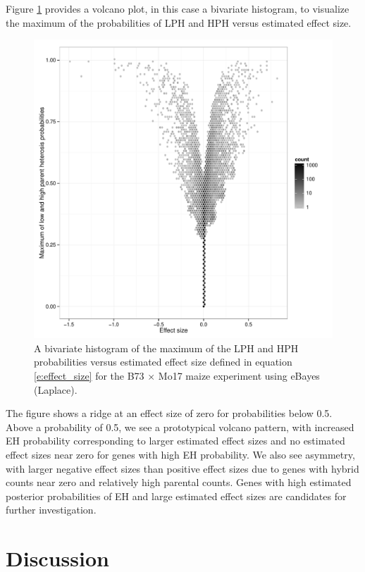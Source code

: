 \documentclass[useAMS,usenatbib,referee]{biom}
\begin{document}
Figure \ref{f:volcano} provides a volcano plot, in this case a bivariate histogram, to visualize the maximum of the probabilities of LPH and HPH versus estimated effect size. 
\begin{figure}
\centerline{\includegraphics[width=\textwidth]{volcano}}
\caption{A bivariate histogram of the maximum of the LPH and HPH probabilities versus estimated effect size defined in equation \eqref{e:effect_size} for the B73 $\times$ Mo17 maize experiment using eBayes (Laplace).}
\label{f:volcano}
\end{figure}
The figure shows a ridge at an effect size of zero for probabilities below 0.5. Above a probability of 0.5, we see a prototypical volcano pattern, with increased EH probability corresponding to larger estimated effect sizes and no estimated effect sizes near zero for genes with high EH probability. We also see asymmetry, with larger negative effect sizes than positive effect sizes due to genes with hybrid counts near zero and relatively high parental counts. Genes with high estimated posterior probabilities of EH and large estimated effect sizes are candidates for further investigation.






\section{Discussion}
\label{s:discussion}
\end{document}
